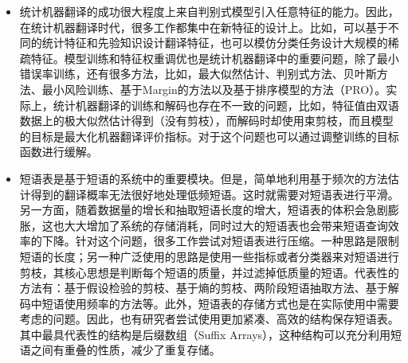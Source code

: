 \begin{itemize}
\vspace{0.5em}
\item 统计机器翻译的成功很大程度上来自判别式模型引入任意特征的能力。因此，在统计机器翻译时代，很多工作都集中在新特征的设计上。比如，可以基于不同的统计特征和先验知识设计翻译特征，也可以模仿分类任务设计大规模的稀疏特征。模型训练和特征权重调优也是统计机器翻译中的重要问题，除了最小错误率训练，还有很多方法，比如，最大似然估计、判别式方法、贝叶斯方法、最小风险训练、基于Margin的方法以及基于排序模型的方法（PRO）。实际上，统计机器翻译的训练和解码也存在不一致的问题，比如，特征值由双语数据上的极大似然估计得到（没有剪枝），而解码时却使用束剪枝，而且模型的目标是最大化机器翻译评价指标。对于这个问题也可以通过调整训练的目标函数进行缓解。
\vspace{0.5em}
\item 短语表是基于短语的系统中的重要模块。但是，简单地利用基于频次的方法估计得到的翻译概率无法很好地处理低频短语。这时就需要对短语表进行平滑。另一方面，随着数据量的增长和抽取短语长度的增大，短语表的体积会急剧膨胀，这也大大增加了系统的存储消耗，同时过大的短语表也会带来短语查询效率的下降。针对这个问题，很多工作尝试对短语表进行压缩。一种思路是限制短语的长度；另一种广泛使用的思路是使用一些指标或者分类器来对短语进行剪枝，其核心思想是判断每个短语的质量，并过滤掉低质量的短语。代表性的方法有：基于假设检验的剪枝、基于熵的剪枝、两阶段短语抽取方法、基于解码中短语使用频率的方法等。此外，短语表的存储方式也是在实际使用中需要考虑的问题。因此，也有研究者尝试使用更加紧凑、高效的结构保存短语表。其中最具代表性的结构是后缀数组（Suffix Arrays），这种结构可以充分利用短语之间有重叠的性质，减少了重复存储。
\vspace{0.5em}
\end{itemize}











